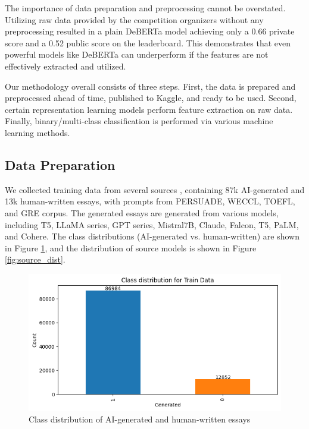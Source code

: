 \documentclass[conference]{IEEEtran}
\begin{document}
The importance of data preparation and preprocessing cannot be overstated. Utilizing raw data provided by the competition organizers without any preprocessing resulted in a plain DeBERTa model achieving only a 0.66 private score and a 0.52 public score on the leaderboard. This demonstrates that even powerful models like DeBERTa can underperform if the features are not effectively extracted and utilized.

Our methodology overall consists of three steps. First, the data is prepared and preprocessed ahead of time, published to Kaggle, and ready to be used. Second, certain representation learning models perform feature extraction on raw data. Finally, binary/multi-class classification is performed via various machine learning methods.

\subsection{Data Preparation}
\label{sec:data}

We collected training data from several sources \cite{persuade,mistral7btext,argugpt,daigtv4,fpeprocessed}, containing 87k AI-generated and 13k human-written essays, with prompts from PERSUADE, WECCL, TOEFL, and GRE corpus. The generated essays are generated from various models, including T5, LLaMA series, GPT series, Mistral7B, Claude, Falcon, T5, PaLM, and Cohere. The class distributions (AI-generated vs. human-written) are shown in Figure \ref{fig:class_dist}, and the distribution of source models is shown in Figure \ref{fig:source_dist}.

\begin{figure}[htbp]
  \centerline{\includegraphics[width=\columnwidth]{figs/class_dist.png}}
  \caption{Class distribution of AI-generated and human-written essays}
  \label{fig:class_dist}
\end{figure}
\end{document}
